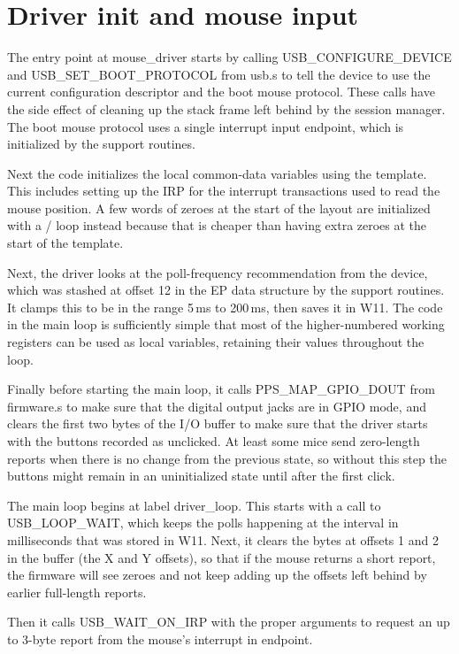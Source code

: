 \section{Driver init and mouse input}

The entry point at mouse\_driver starts by calling USB\_CONFIGURE\_DEVICE
and USB\_SET\_BOOT\_PROTOCOL from usb.s to tell the device to use the current
configuration descriptor and the boot mouse protocol.  These calls have the
side effect of cleaning up the  stack frame left behind by the
session manager.  The boot mouse protocol uses a single interrupt input
endpoint, which is initialized by the support routines.

Next the code initializes the local common-data variables using the
template.  This includes setting up the IRP for the interrupt transactions
used to read the mouse position.  A few words of zeroes at the start of the
layout are initialized with a / loop instead because
that is cheaper than having extra zeroes at the start of the template.

Next, the driver looks at the poll-frequency recommendation from the device,
which was stashed at offset 12 in the EP data structure by the support
routines.  It clamps this to be in the range 5\,ms to 200\,ms, then saves it
in W11.  The code in the main loop is sufficiently simple that most of the
higher-numbered working registers can be used as local variables, retaining
their values throughout the loop.

Finally before starting the main loop, it calls PPS\_MAP\_GPIO\_DOUT from
firmware.s to make sure that the digital output jacks are in GPIO mode, and
clears the first two bytes of the I/O buffer to make sure that the driver
starts with the buttons recorded as unclicked.  At least some mice send
zero-length reports when there is no change from the previous state, so
without this step the buttons might remain in an uninitialized state until
after the first click.

The main loop begins at label driver\_loop.  This starts with a call to
USB\_LOOP\_WAIT, which keeps the polls happening at the interval in
milliseconds that was stored in W11.  Next, it clears the bytes at offsets 1
and 2 in the buffer (the X and Y offsets), so that if the mouse returns a
short report, the firmware will see zeroes and not keep adding up the
offsets left behind by earlier full-length reports.

Then it calls USB\_WAIT\_ON\_IRP with the proper arguments to request an up
to 3-byte report from the mouse's interrupt in endpoint.

